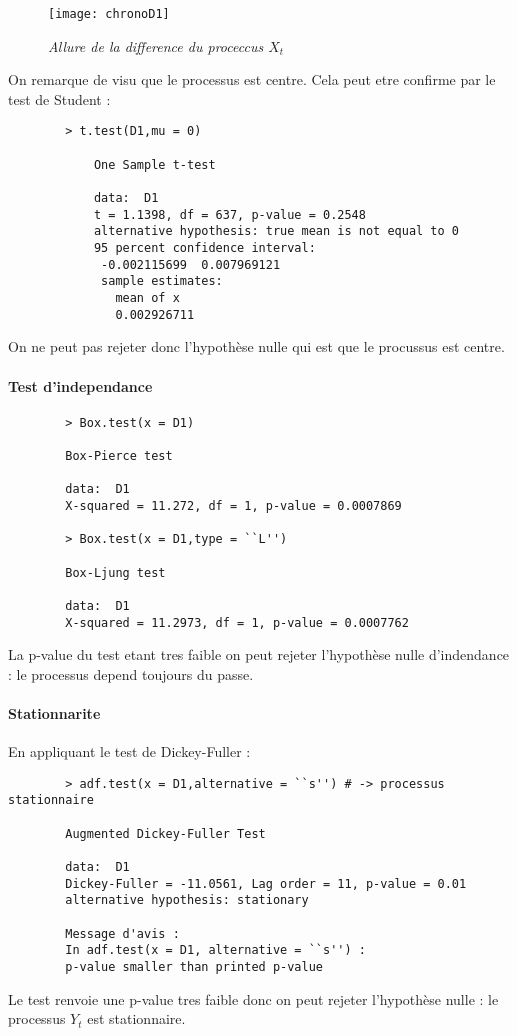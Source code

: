         \begin{figure}[H]
            \centering 
            \label{fig:chronoD1} 
            \texttt{[image: chronoD1]} 
            \caption{\it Allure de la difference du proceccus $X_t$ } 
        \end{figure} 

        On remarque de visu que le processus est centre. Cela peut etre confirme par
        le test de Student :
        \begin{verbatim}
        > t.test(D1,mu = 0)

            One Sample t-test

            data:  D1
            t = 1.1398, df = 637, p-value = 0.2548
            alternative hypothesis: true mean is not equal to 0
            95 percent confidence interval:
             -0.002115699  0.007969121
             sample estimates:
               mean of x 
               0.002926711 

        \end{verbatim}
        On ne peut pas rejeter donc l'hypothèse nulle qui est que le procussus
        est centre.
        \paragraph{Test d'independance}

        \begin{verbatim}
        > Box.test(x = D1)

        Box-Pierce test

        data:  D1
        X-squared = 11.272, df = 1, p-value = 0.0007869

        > Box.test(x = D1,type = ``L'')

        Box-Ljung test

        data:  D1
        X-squared = 11.2973, df = 1, p-value = 0.0007762

        \end{verbatim}
        
        La p-value du test etant tres faible on peut rejeter l'hypothèse nulle
        d'indendance : le processus depend toujours du passe.
        \paragraph{Stationnarite}
    
        En appliquant le test de Dickey-Fuller :
        \begin{verbatim}
        > adf.test(x = D1,alternative = ``s'') # -> processus stationnaire

        Augmented Dickey-Fuller Test

        data:  D1
        Dickey-Fuller = -11.0561, Lag order = 11, p-value = 0.01
        alternative hypothesis: stationary

        Message d'avis :
        In adf.test(x = D1, alternative = ``s'') :
        p-value smaller than printed p-value
        \end{verbatim}
        Le test renvoie une p-value tres faible donc on peut rejeter l'hypothèse
        nulle : le processus $Y_t$ est stationnaire.


